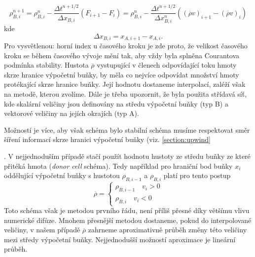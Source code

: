{\begin{equation}
\rho_{B,i}^{n+1} = \rho_{B,i}^{n} - \frac{\Delta t^{n+1/2}}{\Delta x_{B,i}}(F_{i+1}-F_i) = \rho_{B,i}^n-\frac{\Delta t^{n+1/2}}{\Delta x_{B,i}^{n}}\left((\overline{\rho} v)_{i+1}-({\overline \rho} v )_{i}\right)
\end{equation}
kde 
\begin{equation}
\Delta x_{B,i} = x_{A,i+1}-x_{A,i}.
\end{equation}
Pro vysvětlenou: horní index u časového kroku je zde proto, že velikost časového kroku se během časového vývoje mění tak, aby vždy byla splněna Courantova podmínka stability. Hustota $\overline{\rho}$ vystupující v členech odpovídající toku hmoty skrze hranice výpočetní buňky, by měla co nejvíce odpovídat množství hmoty protékající skrze hranice buňky. Její hodnotu dostaneme interpolací, zaléží však na metodě, kterou zvolíme. Dále je třeba upozornit, že byla použita střídavá síť, kde skalární veličiny jsou definovány na středu výpočetní buňky (typ B) a vektorové veličiny na jejích okrajích (typ A).

Možností je více, aby však schéma bylo stabilní schéma musíme respektovat směr šíření informací skrze hranici výpočetní buňky (viz. \ref{section:upwind}}. V nejjednoduším případě stačí použít hodnotu hustoty ze středu buňky ze které přitéká hmota ({\it donor cell} schéma). Tedy například pro hraniční bod buňky $x_i$ oddělující výpočetní buňky s hustotou $\rho_{B,i-1}$ a $\rho_{B,i}$ platí pro tento postup
\begin{equation}
\overline{\rho} =
\begin{cases}
\rho_{B,i-1} \quad v_i > 0 \\
\rho_{B,i} \quad v_i < 0
\end{cases}
\end{equation}
Toto schéma však je metodou prvního řádu, není příliš přesné díky většímu vlivu numerické difůze. Mnohem přesnější metodou dostaneme, pokud do interpolované veličiny, v našem případě $\overline{\rho}$ zahrneme aproximativně průběh změny této veličiny mezi středy výpočetní buňky. Nejjednodušší možností aproximace je lineární průběh.
